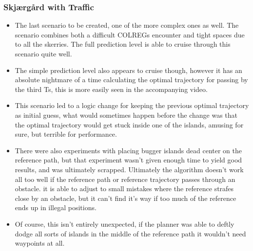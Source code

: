 \subsubsection{Skjærgård with Traffic}
\begin{itemize}
    \item The last scenario to be created, one of the more complex ones as well. The scenario combines both a difficult COLREGs encounter and tight spaces
    due to all the skerries. The full prediction level is able to cruise through this scenario quite well.
    \item The simple prediction level also appears to cruise though, however it has an absolute nightmare of a time calculating the optimal trajectory
    for passing by the third \gls{Ts}, this is more easily seen in the accompanying video.
    \item This scenario led to a logic change for keeping the previous optimal trajectory as initial guess, what would sometimes happen before the change was
    that the optimal trajectory would get stuck inside one of the islands, amusing for sure, but terrible for performance.
    \item There were also experiments with placing bugger islands dead center on the reference path, but that experiment wasn't given enough
    time to yield good results, and was ultimately scrapped. Ultimately the algorithm doesn't work all too well if the reference path or reference trajectory
    passes through an obstacle. it is able to adjust to small mistakes where the reference strafes close by an obstacle, but it can't find it's way if too much of
    the reference ends up in illegal positions.
    \item Of course, this isn't entirely unexpected, if the planner was able to deftly dodge all sorts of islands in the middle of the reference path it wouldn't need waypoints at all.
\end{itemize}

